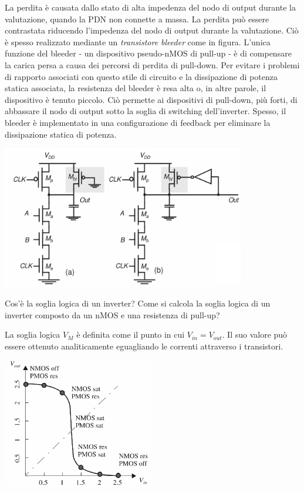 \documentclass[answers,a4paper,12pt]{exam}
\begin{document}
\begin{questions}
\begin{solutionorbox}[5cm]
{}

La perdita è causata dallo stato di alta impedenza del nodo di output durante la valutazione, quando la PDN non connette a massa.
La perdita può essere contrastata riducendo l'impedenza del nodo di output durante la valutazione.
Ciò è spesso realizzato mediante un \textit{transistore bleeder} come in figura. 
L'unica funzione del bleeder - un dispositivo pseudo-nMOS di pull-up - è di compensare la carica persa a causa dei percorsi di perdita di pull-down.
Per evitare i problemi di rapporto associati con questo stile di circuito e la dissipazione di potenza statica associata, la resistenza del bleeder è resa alta o, in altre parole, il dispositivo è tenuto piccolo.
Ciò permette ai dispositivi di pull-down, più forti, di abbassare il nodo di output sotto la soglia di switching dell'inverter.
Spesso, il bleeder è implementato in una configurazione di feedback per eliminare la dissipazione statica di potenza.

{\centering

\includegraphics[width=0.8\textwidth]{SoluzioneCorrentiPerdita.png}

}

    \end{solutionorbox}
\question Cos’è la soglia logica di un inverter? Come si calcola la soglia logica di un inverter composto da un nMOS e una resistenza di pull-up?
\begin{solutionorbox}[5cm]
    La soglia logica $V_M$ è definita come il punto in cui $V_{in} = V_{out}$.
    Il suo valore può essere ottenuto analiticamente eguagliando le correnti attraverso i transistori.
    {\centering

        \includegraphics[width=0.5\textwidth]{CurvaInverter.png}

}
\end{solutionorbox}
\end{questions}
\end{document}
